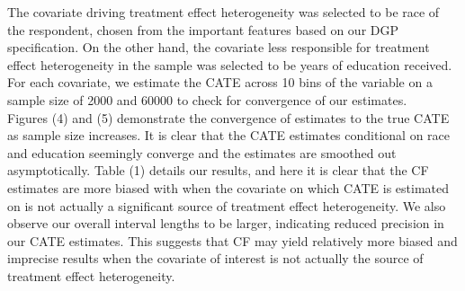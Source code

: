 \documentclass[12pt]{article}
\begin{document}
The  covariate driving treatment effect heterogeneity was selected to be race of the respondent, chosen from the important features based on our DGP specification. On the other hand, the covariate less responsible for treatment effect heterogeneity in the sample was selected to be years of education received. For each covariate, we estimate the CATE across 10 bins of the variable on a sample size of 2000 and 60000 to check for convergence of our estimates. \\ 

Figures (4) and (5) demonstrate the convergence of estimates to the true CATE as sample size increases. It is clear that the CATE estimates conditional on race and education seemingly converge and the estimates are smoothed out asymptotically. Table (1) details our results, and here it is clear that the CF estimates are more biased with when the covariate on which CATE is estimated on is not actually a significant source of treatment effect heterogeneity. We also observe our overall interval lengths to be larger, indicating reduced precision in our CATE estimates. This suggests that CF may yield relatively more biased and imprecise results when the covariate of interest is not actually the source of treatment effect heterogeneity. \\ 
\end{document}

